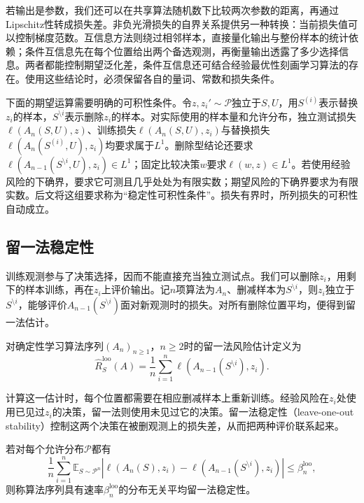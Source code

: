 若输出是参数，我们还可以在共享算法随机数下比较两次参数的距离，再通过Lipschitz性转成损失差。非负光滑损失的自界关系提供另一种转换：当前损失值可以控制梯度范数。互信息方法则绕过相邻样本，直接量化输出与整份样本的统计依赖；条件互信息先在每个位置给出两个备选观测，再衡量输出透露了多少选择信息。两者都能控制期望泛化差，条件互信息还可结合经验最优性刻画学习算法的存在。使用这些结论时，必须保留各自的量词、常数和损失条件。

下面的期望运算需要明确的可积性条件。令$z,z_i'\sim\mathcal P$独立于$S,U$，用$S^{(i)}$表示替换$z_i$的样本，$S^{\setminus i}$表示删除$z_i$的样本。对实际使用的样本量和允许分布，独立测试损失$\ell(A_n(S,U),z)$、训练损失$\ell(A_n(S,U),z_i)$与替换损失$\ell(A_n(S^{(i)},U),z_i)$均要求属于$L^1$。删除型结论还要求$\ell(A_{n-1}(S^{\setminus i},U),z_i)\in L^1$；固定比较决策$w$要求$\ell(w,z)\in L^1$。若使用经验风险的下确界，要求它可测且几乎处处为有限实数；期望风险的下确界要求为有限实数。后文将这组要求称为“稳定性可积性条件”。损失有界时，所列损失的可积性自动成立。

\subsection{留一法稳定性}

训练观测参与了决策选择，因而不能直接充当独立测试点。我们可以删除$z_i$，用剩下的样本训练，再在$z_i$上评价输出。记$n$项算法为$A_n$、删减样本为$S^{\setminus i}$，则$z_i$独立于$S^{\setminus i}$，能够评价$A_{n-1}(S^{\setminus i})$面对新观测时的损失。对所有删除位置平均，便得到留一法估计。

\begin{definition}[留一法风险估计]
\label{def:loo-risk}
对确定性学习算法序列$(A_n)_{n\geq1}$，$n\geq2$时的留一法风险估计定义为
\[
 \hat R_S^{\mathrm{loo}}(A)
 =\frac1n\sum_{i=1}^n\ell(A_{n-1}(S^{\setminus i}),z_i).
\]
\end{definition}

计算这一估计时，每个位置都需要在相应删减样本上重新训练。经验风险在$z_i$处使用已见过$z_i$的决策，留一法则使用未见过它的决策。留一法稳定性（leave-one-out stability）控制这两个决策在被删观测上的损失差，从而把两种评价联系起来。

\begin{definition}[平均留一法稳定性]
\label{def:loo-stability}
若对每个允许分布$\mathcal P$都有
\[
 \frac1n\sum_{i=1}^n\mathbb E_{S\sim\mathcal P^n}
 \left|\ell(A_n(S),z_i)-\ell(A_{n-1}(S^{\setminus i}),z_i)\right|
 \leq\beta_n^{\mathrm{loo}},
\]
则称算法序列具有速率$\beta_n^{\mathrm{loo}}$的分布无关平均留一法稳定性。
\end{definition}

